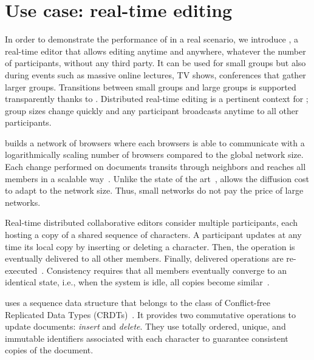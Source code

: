 
\section{Use case: real-time editing}
\label{sec:use-case}

In order to demonstrate the performance of \SPRAY in a real scenario,
we introduce \CRATE, a real-time editor that allows editing anytime
and anywhere, whatever the number of participants, without any third
party. It can be used for small groups but also during events such as
massive online lectures, TV shows, conferences that gather larger
groups. Transitions between small groups and large groups is supported
transparently thanks to \SPRAY. Distributed real-time editing is a
pertinent context for \SPRAY; group sizes change quickly and any
participant broadcasts anytime to all other participants.

\CRATE builds a network of browsers where each browsers is able to
communicate with a logarithmically scaling number of browsers compared
to the global network size. Each change performed on documents
transits through neighbors and reaches all members in a scalable
way~\cite{birman1999bimodal}. Unlike the state of the
art~\cite{tolgyeski2009adaptive, voulgaris2005cyclon}, \SPRAY allows
the diffusion cost to adapt to the network size. Thus, small networks
do not pay the price of large networks.

Real-time distributed collaborative editors consider multiple participants, each
hosting a copy of a shared sequence of characters. A participant updates at any
time its local copy by inserting or deleting a character. Then, the operation is
eventually delivered to all other members. Finally, delivered operations are
re-executed~\cite{saito2005optimistic}. Consistency requires that all members
eventually converge to an identical state, i.e., when the system is idle, all
copies become similar~\cite{bailis2013eventual}.

\CRATE uses a sequence data structure that belongs to the class of Conflict-free
Replicated Data Types (CRDTs)~\cite{shapiro2011conflict,
  shapiro2011comprehensive}. It provides two commutative operations to update
documents: \emph{insert} and \emph{delete}.  They use totally ordered, unique,
and immutable identifiers associated with each character to guarantee consistent
copies of the document. %


